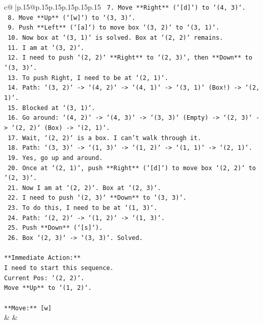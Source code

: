 \documentclass{article}
\begin{document}
{\begin{supertabular}{c@{$\;$}|p{.15\linewidth}@{}p{.15\linewidth}p{.15\linewidth}p{.15\linewidth}p{.15\linewidth}p{.15\linewidth}}
{{{\texttt{        7.  Move **Right** (`{[}d{]}`) to `(4, 3)`.} \\
\texttt{        8.  Move **Up** (`{[}w{]}`) to `(3, 3)`.} \\
\texttt{        9.  Push **Left** (`{[}a{]}`) to move box `(3, 2)` to `(3, 1)`.} \\
\texttt{        10. Now box at `(3, 1)` is solved. Box at `(2, 2)` remains.} \\
\texttt{        11. I am at `(3, 2)`.} \\
\texttt{        12. I need to push `(2, 2)` **Right** to `(2, 3)`, then **Down** to `(3, 3)`.} \\
\texttt{        13. To push Right, I need to be at `(2, 1)`.} \\
\texttt{        14. Path: `(3, 2)` {-}> `(4, 2)` {-}> `(4, 1)` {-}> `(3, 1)` (Box!) {-}> `(2, 1)`.} \\
\texttt{        15. Blocked at `(3, 1)`.} \\
\texttt{        16. Go around: `(4, 2)` {-}> `(4, 3)` {-}> `(3, 3)` (Empty) {-}> `(2, 3)` {-}> `(2, 2)` (Box) {-}> `(2, 1)`.} \\
\texttt{        17. Wait, `(2, 2)` is a box. I can't walk through it.} \\
\texttt{        18. Path: `(3, 3)` {-}> `(1, 3)` {-}> `(1, 2)` {-}> `(1, 1)` {-}> `(2, 1)`.} \\
\texttt{        19. Yes, go up and around.} \\
\texttt{        20. Once at `(2, 1)`, push **Right** (`{[}d{]}`) to move box `(2, 2)` to `(2, 3)`.} \\
\texttt{        21. Now I am at `(2, 2)`. Box at `(2, 3)`.} \\
\texttt{        22. I need to push `(2, 3)` **Down** to `(3, 3)`.} \\
\texttt{        23. To do this, I need to be at `(1, 3)`.} \\
\texttt{        24. Path: `(2, 2)` {-}> `(1, 2)` {-}> `(1, 3)`.} \\
\texttt{        25. Push **Down** (`{[}s{]}`).} \\
\texttt{        26. Box `(2, 3)` {-}> `(3, 3)`. Solved.} \\
\\ 
\texttt{**Immediate Action:**} \\
\texttt{I need to start this sequence.} \\
\texttt{Current Pos: `(2, 2)`.} \\
\texttt{Move **Up** to `(1, 2)`.} \\
\\ 
\texttt{**Move:** {[}w{]}} \\
            }
        }
    }
    & & \\ \\


\end{supertabular}}
\end{document}
